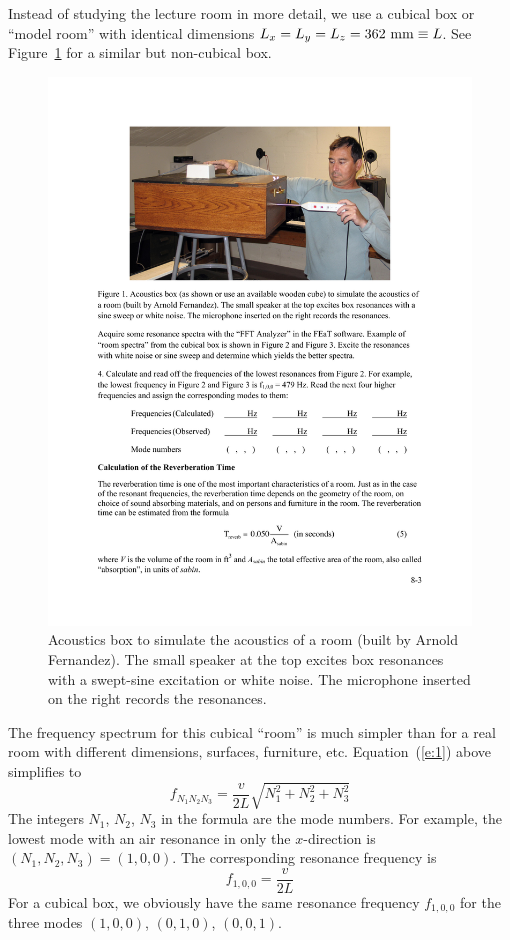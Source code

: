 \documentclass[11pt]{NSF}
\def\be{\begin{equation}}
\def\ee{\end{equation}}
\begin{document}
Instead of studying the lecture room in more detail, we use a cubical
box or ``model room” with identical dimensions 
$L_x =L_y = L_z = 362~{\rm mm}\equiv L$.
See Figure~\ref{f:1} for a similar but non-cubical box. 
%
\begin{figure}[hbtp]
\begin{center}
\includegraphics[width=.7\textwidth]{fig8_1}
\caption{Acoustics box to
simulate the acoustics of a room (built by Arnold Fernandez).  The
small speaker at the top excites box resonances with a swept-sine 
excitation or white noise. 
The microphone inserted on the right records the resonances.}
\label{f:1}
\end{center}
\end{figure}
%
The frequency spectrum for this cubical ``room” is much simpler than
for a real room with different dimensions, surfaces, furniture, etc.
Equation~(\ref{e:1}) above simplifies to
%
\be
f_{N_1N_2N_3} = \frac{v}{2L}\sqrt{N_1^2 + N_2^2 + N_3^2}
\label{e:3}
\ee
%
The integers $N_1$, $N_2$, $N_3$ in the formula are the mode numbers. 
For example, the lowest mode with an air resonance in only the 
$x$-direction is $(N_1, N_2, N_3) = (1, 0, 0)$. 
The corresponding resonance frequency is
%
\be
f_{1,0,0} = \frac{v}{2L}
\ee
%
For a cubical box, we obviously have the same resonance frequency 
$f_{1,0,0}$ for the three modes $(1,0,0)$, $(0,1,0)$, $(0,0,1)$.
\end{document}
